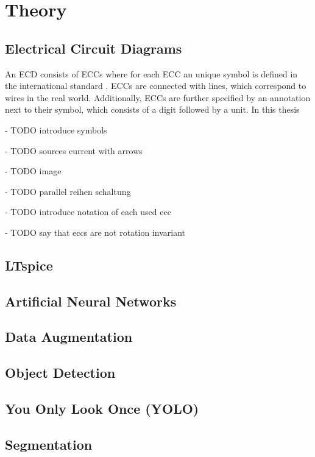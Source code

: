 \chapter{Theory}

\section{Electrical Circuit Diagrams}

An \ac{ECD} consists of \acp{ECC} where for each \ac{ECC} an unique symbol is defined in the international standard \cite{iec60617}.
\acp{ECC} are connected with lines, which correspond to wires in the real world.
Additionally, \acp{ECC} are further specified by an annotation next to their symbol, which consists of a digit followed by a unit.
In this thesis

- TODO introduce symbols

- TODO sources current with arrows

- TODO image

- TODO parallel reihen schaltung

- TODO introduce notation of each used ecc

- TODO say that eccs are not rotation invariant

\section{LTspice}


\section{Artificial Neural Networks}


\section{Data Augmentation}

\section{Object Detection}


\section{You Only Look Once (YOLO)}


\section{Segmentation}



